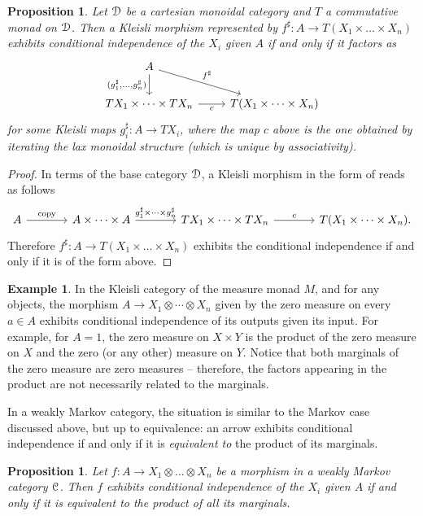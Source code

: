 \documentclass[a4paper,UKenglish,numberwithinsect,cleveref, autoref, thm-restate]{lipics-v2021}
\theoremstyle{plain} %
\newtheorem{myproposition}[mytheorem]{Proposition}
\theoremstyle{definition} %
\newtheorem{myexample}[mytheorem]{Example}
\begin{document}
\begin{myproposition}\label{indepkleisli}
 Let $\mathcal{D}$ be a cartesian monoidal category and $T$ a commutative monad on $\mathcal{D}$.
 Then a Kleisli morphism represented by $f^\sharp:A\to T(X_1\times\dots\times X_n)$ exhibits conditional independence of the $X_i$ given $A$ if and only if it factors as
 \[
 \begin{tikzcd}
  A \ar{d}[swap]{(g_1^\sharp,\dots,g_n^\sharp)} \ar{dr}{f^\sharp} \\
  TX_1\times\dots\times TX_n \ar{r}[swap]{c} & T(X_1\times\dots\times X_n) 
 \end{tikzcd}
 \]
 for some Kleisli maps $g_i^\sharp:A\to TX_i$,
 where the map $c$ above is the one obtained by iterating the lax monoidal structure (which is unique by associativity). 
\end{myproposition}
\begin{proof}
 In terms of the base category $\mathcal{D}$, a Kleisli morphism in the form of  reads as follows
 \[
  \begin{tikzcd}[sep=large]
   A \ar{r}{\mathrm{copy}} & A\times\dots\times A \ar{r}{g_1^\sharp\times\dots\times g_n^\sharp} & TX_1\times\dots\times TX_n \ar{r}{c} & T(X_1\times\dots\times X_n) .
  \end{tikzcd}
 \]
 Therefore $f^\sharp:A\to T(X_1\times\dots\times X_n)$ exhibits the conditional independence if and only if it is of the form above.
\end{proof}

\begin{myexample}\label{zeromeasure}
	In the Kleisli category of the measure monad $M$, and for any objects, the morphism $A \to X_1 \otimes \cdots \otimes X_n$ given by the zero measure on every $a \in A$ exhibits conditional independence of its outputs given its input. For example, for $A=1$, the zero measure on $X\times Y$ is the product of the zero measure on $X$ and the zero (or any other) measure on $Y$.
 Notice that both marginals of the zero measure are zero measures -- therefore, the factors appearing in the product are not necessarily related to the marginals.
\end{myexample}

In a weakly Markov category, the situation is similar to the Markov case discussed above,
but up to equivalence: an arrow exhibits conditional independence if and only if it is \emph{equivalent to} the product of its marginals.

\begin{myproposition}\label{eqcondind}
 Let $f:A\to X_1\otimes\dots\otimes X_n$ be a morphism in a weakly Markov category $\mathcal{C}$. Then $f$ exhibits conditional independence of the $X_i$ given $A$ if and only if it is equivalent to the product of all its marginals.
\end{myproposition}
\end{document}
